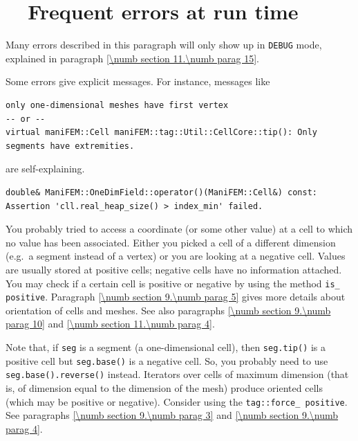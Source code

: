 \section{~~Frequent errors at run time}\label{\numb section 11.\numb parag 14}

Many errors described in this paragraph will only show up in {\small\tt DEBUG} mode,
explained in paragraph \ref{\numb section 11.\numb parag 15}.

Some errors give explicit messages. For instance, messages like

\begin{Verbatim}[commandchars=\\\{\},formatcom=\small\tt,baselinestretch=0.94]
only one-dimensional meshes have first vertex
-- or --
virtual maniFEM::Cell maniFEM::tag::Util::CellCore::tip(): Only segments have extremities. 
\end{Verbatim}

\noindent are self-explaining.

\begin{Verbatim}[commandchars=\\\{\},formatcom=\small\tt,baselinestretch=0.94]
double& ManiFEM::OneDimField::operator()(ManiFEM::Cell&) const:
Assertion 'cll.real_heap_size() > index_min' failed.
\end{Verbatim}

You probably tried to access a coordinate (or some other value) at a cell to which 
no value has been associated.
Either you picked a cell of a different dimension (e.g.\ a segment instead of a
vertex) or you are looking at a negative cell.
Values are usually stored at positive cells; negative cells have no information attached.
You may check if a certain cell is positive or negative by using the method
{\small\tt is\_\,positive}.
Paragraph \ref{\numb section 9.\numb parag 5} gives more details about orientation of
cells and meshes.
See also paragraphs \ref{\numb section 9.\numb parag 10} and
\ref{\numb section 11.\numb parag 4}.

Note that, if {\small\tt seg} is a segment (a one-dimensional cell), then
{\small\tt seg.tip()} is a positive cell but {\small\tt seg.base()} is a negative cell.
So, you probably need to use {\small\tt seg.base().reverse()} instead.
Iterators over cells of maximum dimension (that is, of dimension equal to the dimension
of the mesh) produce oriented cells (which may be positive or negative).
Consider using the {\small\tt\textcolor{tag}{tag}::force\_\,positive}.
See paragraphs \ref{\numb section 9.\numb parag 3} and \ref{\numb section 9.\numb parag 4}.

